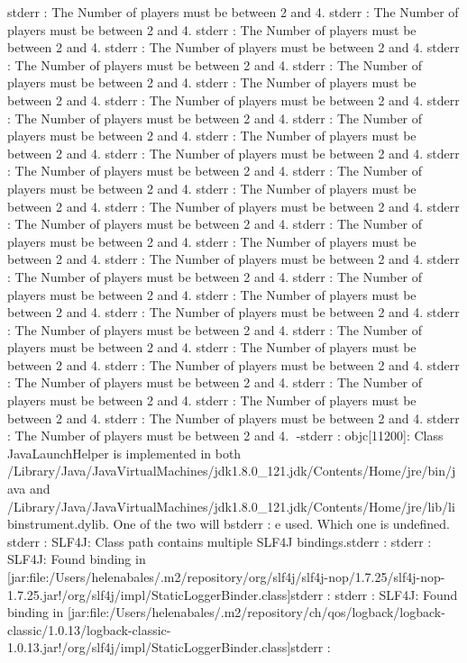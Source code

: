 stderr  : The Number of players must be between 2 and 4.
stderr  : The Number of players must be between 2 and 4.
stderr  : The Number of players must be between 2 and 4.
stderr  : The Number of players must be between 2 and 4.
stderr  : The Number of players must be between 2 and 4.
stderr  : The Number of players must be between 2 and 4.
stderr  : The Number of players must be between 2 and 4.
stderr  : The Number of players must be between 2 and 4.
stderr  : The Number of players must be between 2 and 4.
stderr  : The Number of players must be between 2 and 4.
stderr  : The Number of players must be between 2 and 4.
stderr  : The Number of players must be between 2 and 4.
stderr  : The Number of players must be between 2 and 4.
stderr  : The Number of players must be between 2 and 4.
stderr  : The Number of players must be between 2 and 4.
stderr  : The Number of players must be between 2 and 4.
stderr  : The Number of players must be between 2 and 4.
stderr  : The Number of players must be between 2 and 4.
stderr  : The Number of players must be between 2 and 4.
stderr  : The Number of players must be between 2 and 4.
stderr  : The Number of players must be between 2 and 4.
stderr  : The Number of players must be between 2 and 4.
stderr  : The Number of players must be between 2 and 4.
stderr  : The Number of players must be between 2 and 4.
stderr  : The Number of players must be between 2 and 4.
stderr  : The Number of players must be between 2 and 4.
stderr  : The Number of players must be between 2 and 4.
stderr  : The Number of players must be between 2 and 4.
stderr  : The Number of players must be between 2 and 4.
stderr  : The Number of players must be between 2 and 4.
stderr  : The Number of players must be between 2 and 4.
stderr  : The Number of players must be between 2 and 4.
stderr  : The Number of players must be between 2 and 4.
-stderr  : objc[11200]: Class JavaLaunchHelper is implemented in both /Library/Java/JavaVirtualMachines/jdk1.8.0_121.jdk/Contents/Home/jre/bin/java and /Library/Java/JavaVirtualMachines/jdk1.8.0_121.jdk/Contents/Home/jre/lib/libinstrument.dylib. One of the two will bstderr  : e used. Which one is undefined.
stderr  : SLF4J: Class path contains multiple SLF4J bindings.stderr  : 
stderr  : SLF4J: Found binding in [jar:file:/Users/helenabales/.m2/repository/org/slf4j/slf4j-nop/1.7.25/slf4j-nop-1.7.25.jar!/org/slf4j/impl/StaticLoggerBinder.class]stderr  : 
stderr  : SLF4J: Found binding in [jar:file:/Users/helenabales/.m2/repository/ch/qos/logback/logback-classic/1.0.13/logback-classic-1.0.13.jar!/org/slf4j/impl/StaticLoggerBinder.class]stderr  : 
